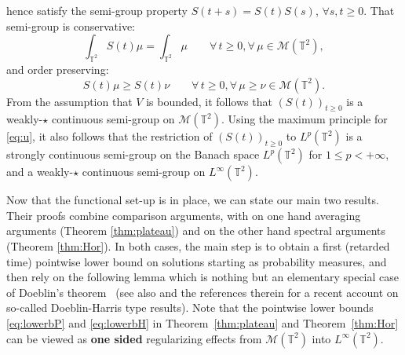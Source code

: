 \documentclass[12pt]{article}
\newcommand{\T}{\mathbb{T}}
\begin{document}
hence satisfy the semi-group property $S(t+s) = S(t)S(s)$, $\forall s,t \geq 0$. 
That semi-group is conservative: 
\begin{equation*}%
\int_{\T^2} S(t)\mu = \int_{\T^2} \mu \qquad \forall\, t\geq 0, \forall\, \mu \in
\mathcal{M}(\T^2),
\end{equation*}
and order preserving: 
\begin{equation*}%
S(t)\mu \geq S(t) \nu \qquad \forall\, t\geq 0, \forall\, \mu \geq \nu \in 
\mathcal{M}(\T^2).
\end{equation*}
From the assumption that $V$ is bounded, it follows that $(S(t))_{t\geq 0}$ is 
a weakly-$\star$ continuous semi-group on $\mathcal{M}(\T^2)$. Using the 
maximum principle for \eqref{eq:u}, it also follows that the restriction of 
$(S(t))_{t\geq 0}$ to $L^p(\T^2)$ is a strongly continuous semi-group on
the Banach space $L^p(\T^2)$ for $1 \leq p < + \infty$, and a weakly-$\star$ 
continuous semi-group on $L^\infty(\T^2).$ 

\medskip
 
Now that the functional set-up is in place, we can state our main two results. 
Their proofs combine comparison arguments, with on one hand averaging arguments 
(Theorem \ref{thm:plateau}) and on the other hand spectral arguments (Theorem
\ref{thm:Hor}). In both cases, the main step is to obtain a first (retarded time) 
pointwise lower bound on solutions starting as probability measures, and then 
rely on the following lemma which is nothing but an elementary special case of 
Doeblin's theorem~\cite{Dob40} (see also \cite{CanMis23} and the references 
therein for a recent account on so-called Doeblin-Harris type results). Note that 
the pointwise lower bounds \eqref{eq:lowerbP} and \eqref{eq:lowerbH} in 
Theorem~\ref{thm:plateau} and Theorem~\ref{thm:Hor} can 
be viewed as {\bf one sided} regularizing effects from $\mathcal{M}(\T^2)$ into $L^\infty(\T^2)$. 
\end{document}
